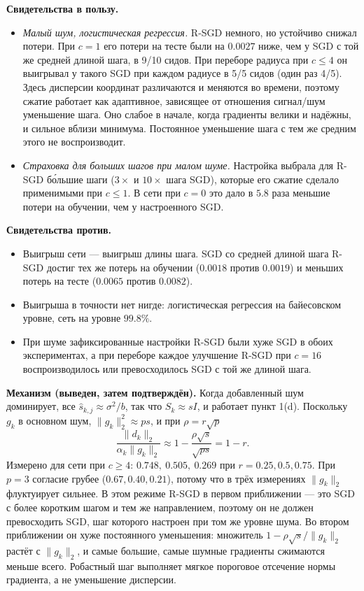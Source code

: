 \documentclass[11pt,a4paper]{article}
\newcommand{\norm}[1]{\lVert #1\rVert_2}
\begin{document}
\textbf{Свидетельства в пользу.}
\begin{itemize}
\item \emph{Малый шум, логистическая регрессия.} R-SGD немного, но устойчиво снижал потери. При
$c=1$ его потери на тесте были на $0.0027$ ниже, чем у SGD с той же средней длиной шага, в 9/10
сидов. При переборе радиуса при $c\le4$ он выигрывал у такого SGD при каждом радиусе в 5/5 сидов
(один раз 4/5). Здесь дисперсии координат различаются и меняются во времени, поэтому сжатие
работает как адаптивное, зависящее от отношения сигнал/шум уменьшение шага. Оно слабое в начале,
когда градиенты велики и надёжны, и сильное вблизи минимума. Постоянное уменьшение шага с тем же
средним этого не воспроизводит.
\item \emph{Страховка для больших шагов при малом шуме.} Настройка выбрала для R-SGD бо́льшие шаги
($3\times$ и $10\times$ шага SGD), которые его сжатие сделало применимыми при $c\le1$. В сети при
$c=0$ это дало в $5.8$ раза меньшие потери на обучении, чем у настроенного SGD.
\end{itemize}

\textbf{Свидетельства против.}
\begin{itemize}
\item Выигрыш сети — выигрыш длины шага. SGD со средней длиной шага R-SGD достиг тех же потерь на
обучении ($0.0018$ против $0.0019$) и меньших потерь на тесте ($0.0065$ против $0.0082$).
\item Выигрыша в точности нет нигде: логистическая регрессия на байесовском уровне, сеть на
уровне $99.8\%$.
\item При шуме зафиксированные настройки R-SGD были хуже SGD в обоих экспериментах, а при
переборе каждое улучшение R-SGD при $c=16$ воспроизводилось или превосходилось SGD с той же
длиной шага.
\end{itemize}

\textbf{Механизм (выведен, затем подтверждён).} Когда добавленный шум доминирует, все
$\widehat s_{k,j}\approx\sigma^2/b$, так что $S_k\approx sI$, и работает пункт 1(d). Поскольку $g_k$ в
основном шум, $\norm{g_k}^2\approx ps$, и при $\rho=r\sqrt p$
\begin{equation*}
\frac{\norm{d_k}}{\alpha_k\norm{g_k}}\approx1-\frac{\rho\sqrt s}{\sqrt{ps}}=1-r .
\end{equation*}
Измерено для сети при $c\ge4$: $0.748,\ 0.505,\ 0.269$ при $r=0.25,0.5,0.75$. При $p=3$ согласие
грубее ($0.67, 0.40, 0.21$), потому что в трёх измерениях $\norm{g_k}$ флуктуирует сильнее. В этом
режиме R-SGD в первом приближении — это SGD с более коротким шагом и тем же направлением, поэтому он
не должен превосходить SGD, шаг которого настроен при том же уровне шума. Во втором приближении он
хуже постоянного уменьшения: множитель $1-\rho\sqrt s/\norm{g_k}$ растёт с $\norm{g_k}$, и самые
большие, самые шумные градиенты сжимаются меньше всего. Робастный шаг выполняет мягкое пороговое
отсечение нормы градиента, а не уменьшение дисперсии.
\end{document}
